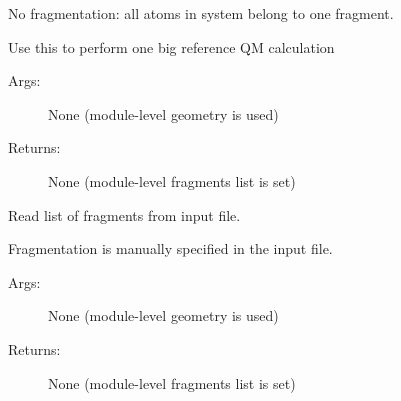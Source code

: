 \documentclass[letterpaper,10pt,english]{sphinxmanual}
\begin{document}

\begin{fulllineitems}
\label{\detokenize{globals:Globals.geom.set_frag_full_system}}
No fragmentation: all atoms in system belong to one fragment.

Use this to perform one big reference QM calculation
\begin{description}
\item[{Args:}] \leavevmode
None (module-level geometry is used)

\item[{Returns:}] \leavevmode
None (module-level fragments list is set)

\end{description}

\end{fulllineitems}


\begin{fulllineitems}
\label{\detokenize{globals:Globals.geom.set_frag_manual}}
Read list of fragments from input file.

Fragmentation is manually specified in the input file.
\begin{description}
\item[{Args:}] \leavevmode
None (module-level geometry is used)

\item[{Returns:}] \leavevmode
None (module-level fragments list is set)

\end{description}

\end{fulllineitems}
\end{document}
